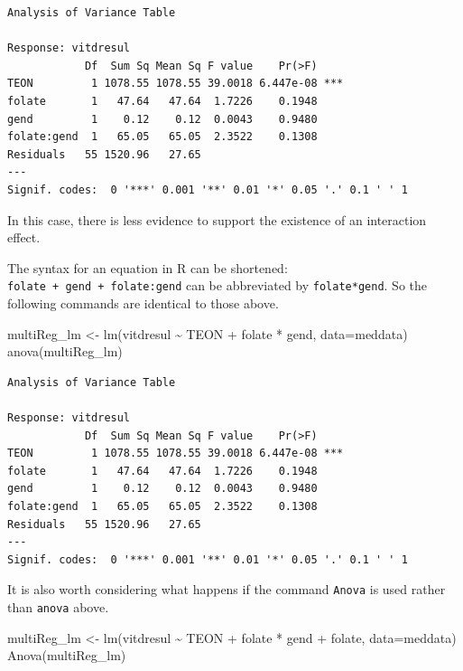 \documentclass[
  oneside]{krantz}
\newenvironment{Shaded}{\begin{snugshade}}{\end{snugshade}}
\newcommand{\AttributeTok}[1]{\textcolor[rgb]{0.77,0.63,0.00}{#1}}
\newcommand{\FunctionTok}[1]{\textcolor[rgb]{0.00,0.00,0.00}{#1}}
\newcommand{\NormalTok}[1]{#1}
\newcommand{\OtherTok}[1]{\textcolor[rgb]{0.56,0.35,0.01}{#1}}
\newcommand{\SpecialCharTok}[1]{\textcolor[rgb]{0.00,0.00,0.00}{#1}}
\begin{document}
\begin{verbatim}
Analysis of Variance Table

Response: vitdresul
            Df  Sum Sq Mean Sq F value    Pr(>F)    
TEON         1 1078.55 1078.55 39.0018 6.447e-08 ***
folate       1   47.64   47.64  1.7226    0.1948    
gend         1    0.12    0.12  0.0043    0.9480    
folate:gend  1   65.05   65.05  2.3522    0.1308    
Residuals   55 1520.96   27.65                      
---
Signif. codes:  0 '***' 0.001 '**' 0.01 '*' 0.05 '.' 0.1 ' ' 1
\end{verbatim}

In this case, there is less evidence to support the existence of an interaction effect.

The syntax for an equation in R can be shortened: \texttt{folate\ +\ gend\ +\ folate:gend} can be abbreviated by \texttt{folate*gend}. So the following commands are identical to those above.

\begin{Shaded}
\begin{Highlighting}[]
\NormalTok{multiReg\_lm }\OtherTok{\textless{}{-}} \FunctionTok{lm}\NormalTok{(vitdresul }\SpecialCharTok{\textasciitilde{}}\NormalTok{ TEON }\SpecialCharTok{+}\NormalTok{ folate }\SpecialCharTok{*}\NormalTok{ gend, }\AttributeTok{data=}\NormalTok{meddata)}
\FunctionTok{anova}\NormalTok{(multiReg\_lm)}
\end{Highlighting}
\end{Shaded}

\begin{verbatim}
Analysis of Variance Table

Response: vitdresul
            Df  Sum Sq Mean Sq F value    Pr(>F)    
TEON         1 1078.55 1078.55 39.0018 6.447e-08 ***
folate       1   47.64   47.64  1.7226    0.1948    
gend         1    0.12    0.12  0.0043    0.9480    
folate:gend  1   65.05   65.05  2.3522    0.1308    
Residuals   55 1520.96   27.65                      
---
Signif. codes:  0 '***' 0.001 '**' 0.01 '*' 0.05 '.' 0.1 ' ' 1
\end{verbatim}

It is also worth considering what happens if the command \texttt{Anova} is used rather than \texttt{anova} above.

\begin{Shaded}
\begin{Highlighting}[]
\NormalTok{multiReg\_lm }\OtherTok{\textless{}{-}} \FunctionTok{lm}\NormalTok{(vitdresul }\SpecialCharTok{\textasciitilde{}}\NormalTok{ TEON }\SpecialCharTok{+}\NormalTok{ folate }\SpecialCharTok{*}\NormalTok{ gend }\SpecialCharTok{+}\NormalTok{ folate, }\AttributeTok{data=}\NormalTok{meddata)}
\FunctionTok{Anova}\NormalTok{(multiReg\_lm)}
\end{Highlighting}
\end{Shaded}
\end{document}
